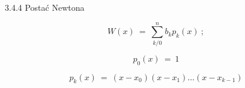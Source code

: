     \begin{frame}{3.4.4 Postać Newtona}
    \begin{block}{}
	$$W(x)\ =\ \sum_{k/0}^{n}b_{k}p_{k}(x)\ ;$$
	\end{block}
	$$p_{0}(x)\ =\ 1$$

	$$p_{k}(x)\ =\ (x-x_{0})(x-x_{1})\ldots(x-x_{k-1})$$

    \end{frame}